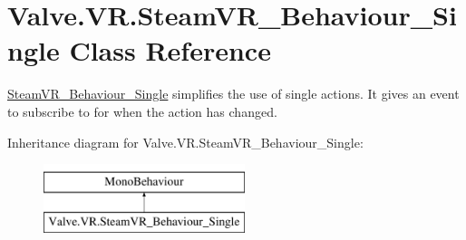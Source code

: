 \hypertarget{class_valve_1_1_v_r_1_1_steam_v_r___behaviour___single}{}\section{Valve.\+V\+R.\+Steam\+V\+R\+\_\+\+Behaviour\+\_\+\+Single Class Reference}
\label{class_valve_1_1_v_r_1_1_steam_v_r___behaviour___single}


\mbox{\hyperlink{class_valve_1_1_v_r_1_1_steam_v_r___behaviour___single}{Steam\+V\+R\+\_\+\+Behaviour\+\_\+\+Single}} simplifies the use of single actions. It gives an event to subscribe to for when the action has changed.  


Inheritance diagram for Valve.\+V\+R.\+Steam\+V\+R\+\_\+\+Behaviour\+\_\+\+Single\+:\begin{figure}[H]
\begin{center}
\leavevmode
\includegraphics[height=2.000000cm]{class_valve_1_1_v_r_1_1_steam_v_r___behaviour___single}
\end{center}
\end{figure}

